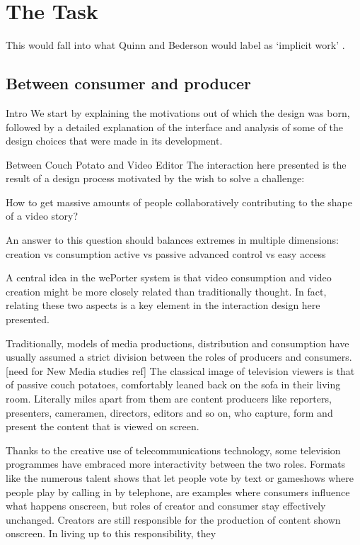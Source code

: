 \section{The Task}

This would fall into what Quinn and Bederson would label as `implicit work' \cite{Quinn:2011us}.
\subsection{Between consumer and producer}


Intro
We start by explaining the motivations out of which the design was born, followed by a detailed explanation of the interface and analysis of some of the design choices that were made in its development.

Between Couch Potato and Video Editor
The interaction here presented is the result of a design process motivated by the wish to solve a challenge:

How to get massive amounts of people collaboratively contributing to the shape of a video story?

An answer to this question should balances extremes in multiple dimensions:
creation vs consumption
active vs passive
advanced control vs easy access

A central idea in the wePorter system is that video consumption and video creation might be more closely related than traditionally thought. In fact, relating these two aspects is a key element in the interaction design here presented.

Traditionally, models of media productions, distribution and consumption have usually assumed a strict division between the roles of producers and consumers. [need for New Media studies ref] The classical image of television viewers is that of passive couch potatoes, comfortably leaned back on the sofa in their living room. Literally miles apart from them are content producers like reporters, presenters, cameramen, directors, editors and so on, who capture, form and present the content that is viewed on screen.

Thanks to the creative use of telecommunications technology, some television programmes have embraced more interactivity between the two roles. Formats like the numerous talent shows that let people vote by text or gameshows where people play by calling in by telephone, are examples where consumers influence what happens onscreen, but roles of creator and consumer stay effectively unchanged. Creators are still responsible for the production of content shown onscreen. In living up to this responsibility, they

